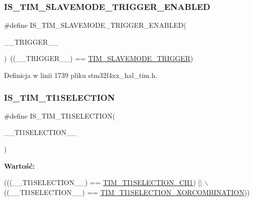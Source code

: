 \subsubsection{\texorpdfstring{I\+S\+\_\+\+T\+I\+M\+\_\+\+S\+L\+A\+V\+E\+M\+O\+D\+E\+\_\+\+T\+R\+I\+G\+G\+E\+R\+\_\+\+E\+N\+A\+B\+L\+ED}{IS\_TIM\_SLAVEMODE\_TRIGGER\_ENABLED}}
{\footnotesize\ttfamily \#define I\+S\+\_\+\+T\+I\+M\+\_\+\+S\+L\+A\+V\+E\+M\+O\+D\+E\+\_\+\+T\+R\+I\+G\+G\+E\+R\+\_\+\+E\+N\+A\+B\+L\+ED(\begin{DoxyParamCaption}\item[{}]{\+\_\+\+\_\+\+T\+R\+I\+G\+G\+E\+R\+\_\+\+\_\+ }\end{DoxyParamCaption})~((\+\_\+\+\_\+\+T\+R\+I\+G\+G\+E\+R\+\_\+\+\_\+) == \hyperlink{group___t_i_m___slave___mode_ga12f8f7b4a16b438f54cf811f0bb0a8a4}{T\+I\+M\+\_\+\+S\+L\+A\+V\+E\+M\+O\+D\+E\+\_\+\+T\+R\+I\+G\+G\+ER})}



Definicja w linii 1739 pliku stm32f4xx\+\_\+hal\+\_\+tim.\+h.

\mbox{\label{group___t_i_m___private___macros_ga6198cc86401c7b2ca26f5074847cda13}} 
\subsubsection{\texorpdfstring{I\+S\+\_\+\+T\+I\+M\+\_\+\+T\+I1\+S\+E\+L\+E\+C\+T\+I\+ON}{IS\_TIM\_TI1SELECTION}}
{\footnotesize\ttfamily \#define I\+S\+\_\+\+T\+I\+M\+\_\+\+T\+I1\+S\+E\+L\+E\+C\+T\+I\+ON(\begin{DoxyParamCaption}\item[{}]{\+\_\+\+\_\+\+T\+I1\+S\+E\+L\+E\+C\+T\+I\+O\+N\+\_\+\+\_\+ }\end{DoxyParamCaption})}

{\bfseries Wartość\+:}
\begin{DoxyCode}
(((\_\_TI1SELECTION\_\_) == \hyperlink{group___t_i_m___t_i1___selection_gace6563bccf7635461f660fbed6241488}{TIM\_TI1SELECTION\_CH1}) || \(\backslash\)
                                                ((\_\_TI1SELECTION\_\_) == 
      \hyperlink{group___t_i_m___t_i1___selection_ga40dfcb0e3f2fdf0f45cbba227106310a}{TIM\_TI1SELECTION\_XORCOMBINATION}))
\end{DoxyCode}


